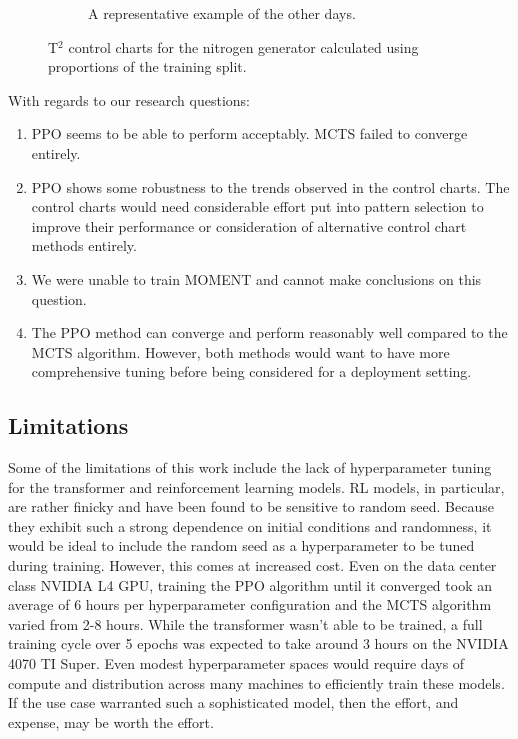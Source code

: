 \documentclass[12pt]{article}
\begin{document}
\begin{figure}[ht!]
\begin{subfigure}[b]{0.5\textwidth}
        \caption{{\small A representative example of the other days.}}
    \end{subfigure}
    \caption{T$^2$ control charts for the nitrogen generator calculated using proportions of the training split.}
\end{figure}

With regards to our research questions:
\begin{enumerate}
    \item PPO seems to be able to perform acceptably. MCTS failed to converge entirely.
    \item PPO shows some robustness to the trends observed in the control charts. The control charts would need considerable effort put into pattern selection to improve their performance or consideration of alternative control chart methods entirely.
    \item We were unable to train MOMENT and cannot make conclusions on this question.
    \item The PPO method can converge and perform reasonably well compared to the MCTS algorithm. However, both methods would want to have more comprehensive tuning before being considered for a deployment setting.
\end{enumerate}

\subsection{Limitations}
Some of the limitations of this work include the lack of hyperparameter tuning for the transformer and reinforcement learning models. RL models, in particular, are rather finicky and
have been found to be sensitive to random seed. Because they exhibit such a strong dependence on initial conditions and randomness, it would be ideal to include the random seed as a
hyperparameter to be tuned during training. However, this comes at increased cost. Even on the data center class NVIDIA L4 GPU, training the PPO algorithm until it converged took an
average of 6 hours per hyperparameter configuration and the MCTS algorithm varied from 2-8 hours. While the transformer wasn't able to be trained, a full training cycle over 5 epochs
was expected to take around 3 hours on the NVIDIA 4070 TI Super. Even modest hyperparameter spaces would require days of compute and distribution across many machines to efficiently
train these models. If the use case warranted such a sophisticated model, then the effort, and expense, may be worth the effort.
\end{document}
